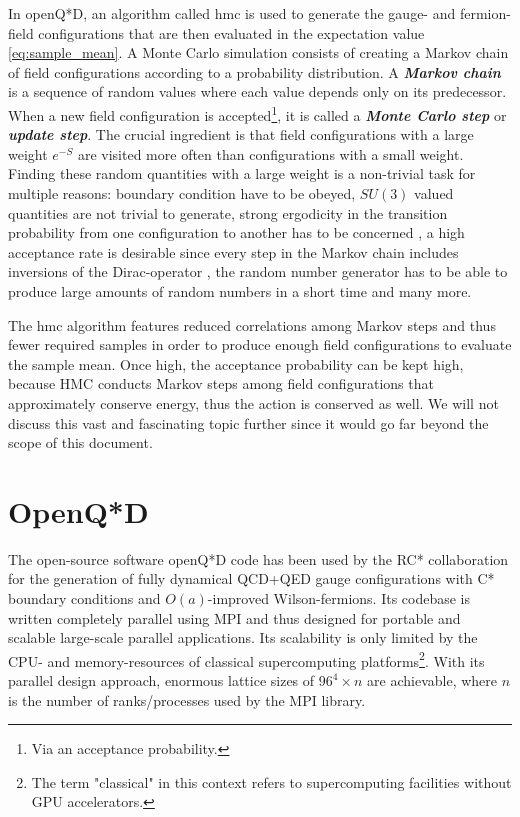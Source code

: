 \documentclass{article}
\theoremstyle{plain} %
\theoremstyle{convention} %
\theoremstyle{remark} %
\def\df#1{\textbf{\textit{#1}}}
\numberwithin{equation}{section}
\begin{document}
In openQ*D, an algorithm called \acrfull{hmc} is used to generate the gauge- and fermion-field configurations that are then evaluated in the expectation value \eqref{eq:sample_mean}. A Monte Carlo simulation consists of creating a Markov chain of field configurations according to a probability distribution. A \df{Markov chain} is a sequence of random values where each value depends only on its predecessor. When a new field configuration is accepted\footnote{Via an acceptance probability.}, it is called a \df{Monte Carlo step} or \df{update step}. The crucial ingredient is that field configurations with a large weight $e^{-S}$ are visited more often than configurations with a small weight. Finding these random quantities with a large weight is a non-trivial task for multiple reasons: boundary condition have to be obeyed, $SU(3)$ valued quantities are not trivial to generate, strong ergodicity in the transition probability from one configuration to another has to be concerned \cite{finkler2020,adler1988}, a high acceptance rate is desirable since every step in the Markov chain includes inversions of the Dirac-operator \cite{gupta1990}, the random number generator has to be able to produce large amounts of random numbers in a short time \cite{gentle2003} and many more.

The \acrshort{hmc} algorithm \cite{duane1987} features reduced correlations among Markov steps and thus fewer required samples in order to produce enough field configurations to evaluate the sample mean. Once high, the acceptance probability can be kept high, because HMC conducts Markov steps among field configurations that approximately conserve energy, thus the action is conserved as well. We will not discuss this vast and fascinating topic further since it would go far beyond the scope of this document.

\newpage

\section{OpenQ*D}

\label{sec:openqxd}

The open-source software openQ*D code has been used by the RC* collaboration for the generation of fully dynamical QCD+QED gauge configurations with C* boundary conditions and $O(a)$-improved Wilson-fermions. Its codebase is written completely parallel using MPI and thus designed for portable and scalable large-scale parallel applications. Its scalability is only limited by the CPU- and memory-resources of classical supercomputing platforms\footnote{The term "classical" in this context refers to supercomputing facilities without GPU accelerators.}. With its parallel design approach, enormous lattice sizes of $96^4 \times n$ are achievable, where $n$ is the number of ranks/processes used by the MPI library.
\end{document}
